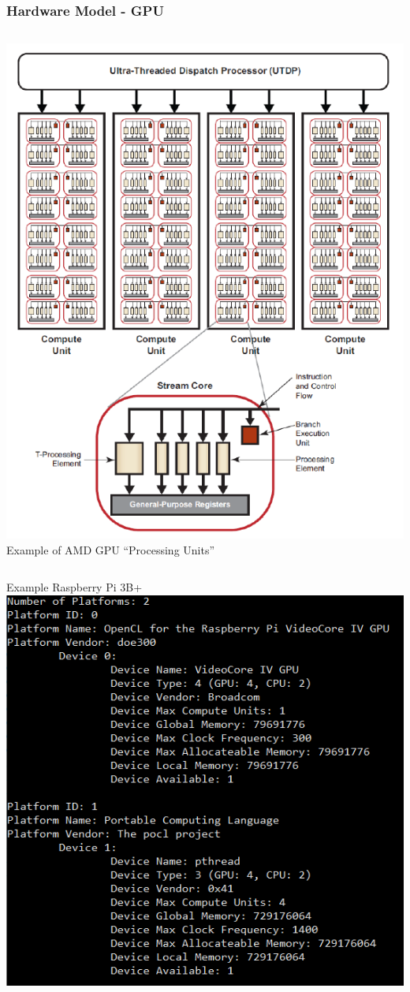 \documentclass{beamer}
\begin{document}
\begin{frame}
    \frametitle{Hardware Model - GPU}
    \begin{columns}
        \includegraphics[width=\textwidth]{res/ATIComputeDevice.png}
        Example of AMD GPU ``Processing Units''
    \end{columns}
\end{frame}
\begin{frame}{Example Raspberry Pi 3B+}
    \includegraphics[height=.8\textheight]{res/RaspberryPiData.PNG}
\end{frame}
\end{document}

